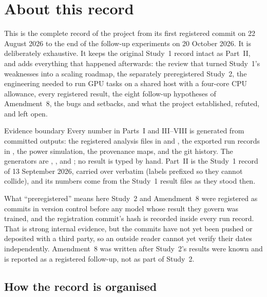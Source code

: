 \chapter*{About this record}

This is the complete record of the \cytofair{} project from its first registered commit on 22 August 2026 to
the end of the follow-up experiments on 20 October 2026. It is deliberately exhaustive. It keeps the original
Study~1 record intact as Part~II, and adds everything that happened afterwards: the review that turned Study~1's
weaknesses into a scaling roadmap, the separately preregistered Study~2, the engineering needed to run \RecAllTasks
GPU tasks on a shared host with a four-core CPU allowance, every registered result, the eight follow-up
hypotheses of Amendment~8, the bugs and setbacks, and what the project established, refuted, and left open.

\begin{keybox}{Evidence boundary}
Every number in Parts~I and III--VIII is generated from committed outputs: the registered analysis files in
 and , the exported run records in
, the power simulation, the provenance maps, and the git history. The
generators are , , and
; no result is typed by hand. Part~II is the Study~1 record of 13
September 2026, carried over verbatim (labels prefixed so they cannot collide), and its numbers come from the Study~1
result files as they stood then.
\end{keybox}

\begin{warningbox}{What ``preregistered'' means here}
Study~2 and Amendment~8 were registered as commits in version control before any model whose result they govern was
trained, and the registration commit's hash is recorded inside every run record. That is strong internal evidence, but
the commits have not yet been pushed or deposited with a third party, so an outside reader cannot yet verify their
dates independently. Amendment~8 was written after Study~2's results were known and is reported as a registered
follow-up, not as part of Study~2.
\end{warningbox}

\section*{How the record is organised}

